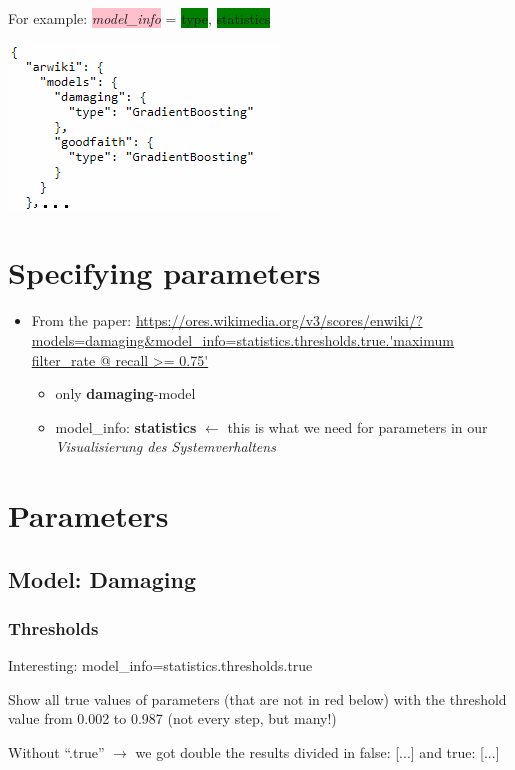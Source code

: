 \documentclass[12pt,a4paper]{article}
\begin{document}
\begin{itemize}
\begin{description}
\item For example: \colorbox{pink}{\textit{model\_info}} = \colorbox{green}{type}, \colorbox{green}{statistics}
\item \includegraphics[scale=0.8]{resources/2/ORESscoresType}
\end{description}
\end{itemize}
\section{Specifying parameters}
\begin{itemize}
\item From the paper: \url{https://ores.wikimedia.org/v3/scores/enwiki/?models=damaging&model_info=statistics.thresholds.true.'maximum filter_rate @ recall >= 0.75'}
\begin{itemize}
\item only \textbf{damaging}-model
\item model\_info: \textbf{statistics} $\leftarrow$ this is what we need for parameters in our \textit{Visualisierung des Systemverhaltens}
\end{itemize}
\end{itemize}
\section{Parameters}
\subsection{Model: Damaging}
\subsubsection{Thresholds}
Interesting: model\_info=statistics.thresholds.true
\begin{description}
\item Show all true values of parameters (that are not in red below) with the threshold value from 0.002 to 0.987 (not every step, but many!)
\item Without ``.true'' $\rightarrow$ we got double the results divided in false: [...] and true: [...]
\end{description}
\end{document}
